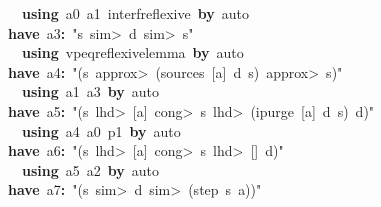 \documentclass{article}
\newcommand{\syntaxKEYWORDA}[1]{\textcolor[rgb]{0.0,0.4,0.6}{\textbf{#1}}}
\newcommand{\syntaxLITERALA}[1]{\textcolor[rgb]{1.0,0.0,0.8}{#1}}
\newcommand{\syntaxOPERATOR}[1]{\textcolor[rgb]{0.0,0.0,0.0}{\textbf{#1}}}
\newcommand{\syntaxKEYWORDA}[1]{\textcolor[rgb]{0.0,0.4,0.6}{\textbf{#1}}}
\newcommand{\syntaxLITERALA}[1]{\textcolor[rgb]{1.0,0.0,0.8}{#1}}
\newcommand{\syntaxOPERATOR}[1]{\textcolor[rgb]{0.0,0.0,0.0}{\textbf{#1}}}
\newcommand{\syntaxKEYWORDA}[1]{\textcolor[rgb]{0.0,0.4,0.6}{\textbf{#1}}}
\newcommand{\syntaxLITERALA}[1]{\textcolor[rgb]{1.0,0.0,0.8}{#1}}
\newcommand{\syntaxOPERATOR}[1]{\textcolor[rgb]{0.0,0.0,0.0}{\textbf{#1}}}
\newcommand{\syntaxKEYWORDA}[1]{\textcolor[rgb]{0.0,0.4,0.6}{#1}}
\newcommand{\syntaxLITERALA}[1]{\textcolor[rgb]{1.0,0.0,0.8}{\textbf{#1}}}
\newcommand{\syntaxOPERATOR}[1]{\textcolor[rgb]{0.0,0.0,0.0}{#1}}
\newcommand{\syntaxKEYWORDA}[1]{\textcolor[rgb]{0.0,0.4,0.6}{\textbf{#1}}}
\newcommand{\syntaxLITERALA}[1]{\textcolor[rgb]{1.0,0.0,0.8}{#1}}
\newcommand{\syntaxOPERATOR}[1]{\textcolor[rgb]{0.0,0.0,0.0}{\textbf{#1}}}
\newcommand{\syntaxKEYWORDA}[1]{\textcolor[rgb]{0.0,0.4,0.6}{\textbf{#1}}}
\newcommand{\syntaxLITERALA}[1]{\textcolor[rgb]{1.0,0.0,0.8}{#1}}
\newcommand{\syntaxOPERATOR}[1]{\textcolor[rgb]{0.0,0.0,0.0}{\textbf{#1}}}
\begin{document}
{\ }{\ }{\ }{\ }{\ }{\ }{\ }{\ }{\ }{\ }{\ }{\ }{\ }{\ }\syntaxKEYWORDA{using}{\ }a0{\ }a1{\ }interf\usebox{\underscorebox}reflexive{\ }\syntaxKEYWORDA{by}{\ }auto\hspace*{\fill}\\
{\ }{\ }{\ }{\ }{\ }{\ }{\ }{\ }{\ }{\ }{\ }{\ }\syntaxKEYWORDA{have}{\ }a3\syntaxOPERATOR{:}{\ }\syntaxLITERALA{"s{\ }\<sim>{\ }d{\ }\<sim>{\ }s"}\hspace*{\fill}\\
{\ }{\ }{\ }{\ }{\ }{\ }{\ }{\ }{\ }{\ }{\ }{\ }{\ }{\ }\syntaxKEYWORDA{using}{\ }vpeq\usebox{\underscorebox}reflexive\usebox{\underscorebox}lemma{\ }\syntaxKEYWORDA{by}{\ }auto\hspace*{\fill}\\
{\ }{\ }{\ }{\ }{\ }{\ }{\ }{\ }{\ }{\ }{\ }{\ }\syntaxKEYWORDA{have}{\ }a4\syntaxOPERATOR{:}{\ }\syntaxLITERALA{"(s{\ }\<approx>{\ }(sources{\ }{[}a{]}{\ }d{\ }s){\ }\<approx>{\ }s)"}\hspace*{\fill}\\
{\ }{\ }{\ }{\ }{\ }{\ }{\ }{\ }{\ }{\ }{\ }{\ }{\ }{\ }\syntaxKEYWORDA{using}{\ }a1{\ }a3{\ }\syntaxKEYWORDA{by}{\ }auto\hspace*{\fill}\\
{\ }{\ }{\ }{\ }{\ }{\ }{\ }{\ }{\ }{\ }{\ }{\ }\syntaxKEYWORDA{have}{\ }a5\syntaxOPERATOR{:}{\ }\syntaxLITERALA{"(s{\ }\<lhd>{\ }{[}a{]}{\ }\<cong>{\ }s{\ }\<lhd>{\ }(ipurge{\ }{[}a{]}{\ }d{\ }s){\ }\usebox{\atbox}{\ }d)"}\hspace*{\fill}\\
{\ }{\ }{\ }{\ }{\ }{\ }{\ }{\ }{\ }{\ }{\ }{\ }{\ }{\ }\syntaxKEYWORDA{using}{\ }a4{\ }a0{\ }p1{\ }\syntaxKEYWORDA{by}{\ }auto\hspace*{\fill}\\
{\ }{\ }{\ }{\ }{\ }{\ }{\ }{\ }{\ }{\ }{\ }{\ }\syntaxKEYWORDA{have}{\ }a6\syntaxOPERATOR{:}{\ }\syntaxLITERALA{"(s{\ }\<lhd>{\ }{[}a{]}{\ }\<cong>{\ }s{\ }\<lhd>{\ }{[}{]}{\ }\usebox{\atbox}{\ }d)"}\hspace*{\fill}\\
{\ }{\ }{\ }{\ }{\ }{\ }{\ }{\ }{\ }{\ }{\ }{\ }{\ }{\ }\syntaxKEYWORDA{using}{\ }a5{\ }a2{\ }\syntaxKEYWORDA{by}{\ }auto\hspace*{\fill}\\
{\ }{\ }{\ }{\ }{\ }{\ }{\ }{\ }{\ }{\ }{\ }{\ }\syntaxKEYWORDA{have}{\ }a7\syntaxOPERATOR{:}{\ }\syntaxLITERALA{"(s{\ }\<sim>{\ }d{\ }\<sim>{\ }(step{\ }s{\ }a))"}\hspace*{\fill}\\
\end{document}
